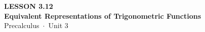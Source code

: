 \documentclass[aspectratio=169, 11pt]{beamer}
\begin{document}
{
\begin{frame}[plain]
  \vspace{2.8cm}\hspace{0.55cm}%
  \begin{minipage}{0.9\textwidth}
    {\color{goldacc}\bfseries\small LESSON 3.12}\\[0.5cm]
    {\color{white}\bfseries\LARGE Equivalent Representations of Trigonometric Functions}\\[1.2cm]
    {\color{skymid}\small Precalculus~$\cdot$~Unit 3}
  \end{minipage}
\end{frame}
}

\end{document}
